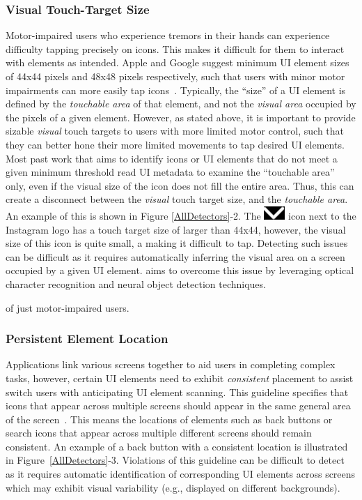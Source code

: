 \subsubsection{Visual Touch-Target Size}
Motor-impaired users who experience tremors in their hands can experience difficulty tapping precisely on icons. This makes it difficult for them to interact with elements as intended. Apple and Google suggest minimum UI element sizes of 44x44 pixels and 48x48 pixels respectively, such that users with minor motor impairments can more easily tap icons~\cite{AppleAccess,GoogleAccess}. 
Typically, the ``size'' of a UI element is defined by the \textit{touchable area} of that element, and not the \textit{visual area} occupied by the pixels of a given element. However, as stated above, it is important to provide sizable \textit{visual} touch targets to users with more limited motor control, such that they can better hone their more limited movements to tap desired UI elements. Most past work that aims to identify icons or UI elements that do not meet a given minimum threshold read UI metadata to examine the ``touchable area'' only, even if the visual size of the icon does not fill the entire area. Thus, this can create a disconnect between the \textit{visual} touch target size, and the \textit{touchable area}. An example of this is shown in Figure \ref{AllDetectors}-2. The \includegraphics[width=0.04\linewidth]{imgs/insta-icon.png} icon next to the Instagram logo has a touch target size of larger than 44x44, however, the visual size of this icon is quite small, a making it difficult to tap. Detecting such issues can be difficult as it requires automatically inferring the visual area on a screen occupied by a given UI element. \MotorEase aims to overcome this issue by leveraging optical character recognition and neural object detection techniques.

 of just motor-impaired users. 
\vspace{-0.5em}
\subsubsection{Persistent Element Location}

Applications link various screens together to aid users in completing complex tasks, however, certain UI elements need to exhibit \textit{consistent} placement to assist switch users with anticipating UI element scanning. This guideline specifies that icons that appear across multiple screens should appear in the same general area of the screen~\cite{AppleAccess,GoogleAccess}. This means the locations of elements such as back buttons or search icons that appear across multiple different screens should remain consistent. An example of a back button with a consistent location is illustrated in Figure~\ref{AllDetectors}-3. Violations of this guideline can be difficult to detect as it requires automatic identification of corresponding UI elements across screens which may exhibit visual variability (e.g., displayed on different backgrounds).


